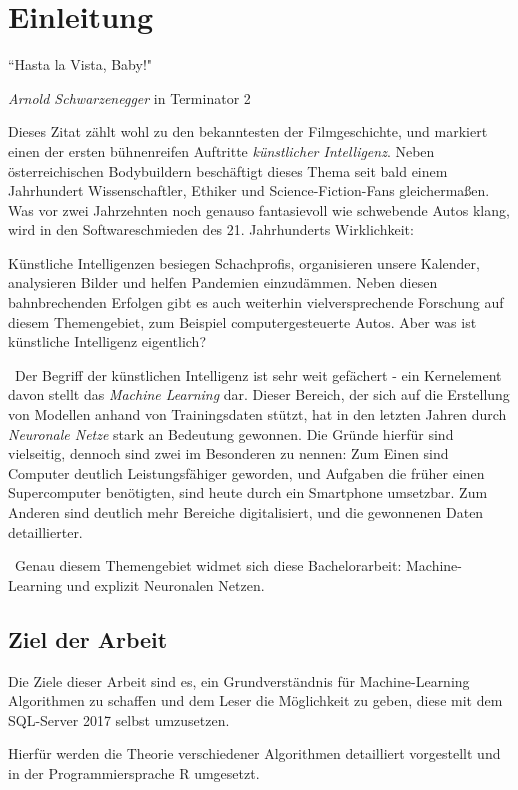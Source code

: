 \chapter{Einleitung}
\label{cha:Einleitung}
\setlength{\epigraphwidth}{4in}
\epigraph{“Hasta la Vista, Baby!"}{\textit{Arnold Schwarzenegger} \textup{ in Terminator 2}}

Dieses Zitat zählt wohl zu den bekanntesten der Filmgeschichte, und markiert einen der ersten bühnenreifen Auftritte \textit{künstlicher Intelligenz}. Neben österreichischen Bodybuildern beschäftigt dieses Thema seit bald einem Jahrhundert Wissenschaftler, Ethiker und Science-Fiction-Fans gleichermaßen. Was vor zwei Jahrzehnten noch genauso fantasievoll wie schwebende Autos klang, wird in den Softwareschmieden des 21. Jahrhunderts Wirklichkeit: 

Künstliche Intelligenzen besiegen Schachprofis, organisieren unsere Kalender, analysieren Bilder und helfen Pandemien einzudämmen. Neben diesen bahnbrechenden Erfolgen gibt es auch weiterhin vielversprechende Forschung auf diesem Themengebiet, zum Beispiel computergesteuerte Autos. Aber was ist künstliche Intelligenz eigentlich?

~\newline Der Begriff der künstlichen Intelligenz ist sehr weit gefächert - ein Kernelement davon stellt das \textit{Machine Learning} dar. Dieser Bereich, der sich auf die Erstellung von Modellen anhand von Trainingsdaten stützt, hat in den letzten Jahren durch \textit{Neuronale Netze} stark an Bedeutung gewonnen. Die Gründe hierfür sind vielseitig, dennoch sind zwei im Besonderen zu nennen: Zum Einen sind Computer deutlich Leistungsfähiger geworden, und Aufgaben die früher einen Supercomputer benötigten, sind heute durch ein Smartphone umsetzbar. Zum Anderen sind deutlich mehr Bereiche digitalisiert, und die gewonnenen Daten detaillierter. 

~\newline Genau diesem Themengebiet widmet sich diese Bachelorarbeit: Machine-Learning und explizit Neuronalen Netzen. 
\section{Ziel der Arbeit}
\label{sec:ZielDerArbeit}
Die Ziele dieser Arbeit sind es, ein Grundverständnis für Machine-Learning Algorithmen zu schaffen und dem Leser die Möglichkeit zu geben, diese mit dem SQL-Server 2017 selbst umzusetzen. 

Hierfür werden die Theorie verschiedener Algorithmen detailliert vorgestellt und in der Programmiersprache R umgesetzt. 

